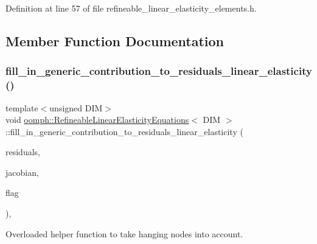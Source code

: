 Definition at line 57 of file refineable\+\_\+linear\+\_\+elasticity\+\_\+elements.\+h.



\subsection{Member Function Documentation}
\mbox{\label{classoomph_1_1RefineableLinearElasticityEquations_ae2f77382b9fdb12eb7b4ba0dc6c239ef}} 
\subsubsection{\texorpdfstring{fill\+\_\+in\+\_\+generic\+\_\+contribution\+\_\+to\+\_\+residuals\+\_\+linear\+\_\+elasticity()}{fill\_in\_generic\_contribution\_to\_residuals\_linear\_elasticity()}}
{\footnotesize\ttfamily template$<$unsigned D\+IM$>$ \\
void \hyperlink{classoomph_1_1RefineableLinearElasticityEquations}{oomph\+::\+Refineable\+Linear\+Elasticity\+Equations}$<$ D\+IM $>$\+::fill\+\_\+in\+\_\+generic\+\_\+contribution\+\_\+to\+\_\+residuals\+\_\+linear\+\_\+elasticity (\begin{DoxyParamCaption}\item[{\hyperlink{classoomph_1_1Vector}{Vector}$<$ double $>$ \&}]{residuals,  }\item[{\hyperlink{classoomph_1_1DenseMatrix}{Dense\+Matrix}$<$ double $>$ \&}]{jacobian,  }\item[{unsigned}]{flag }\end{DoxyParamCaption})\hspace{0.3cm}{\ttfamily [private]}, {\ttfamily [virtual]}}



Overloaded helper function to take hanging nodes into account. 

